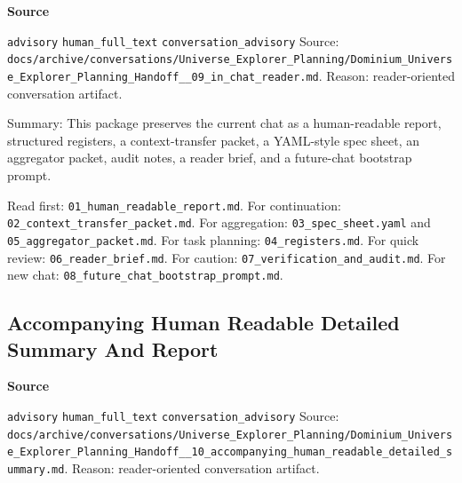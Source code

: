 \documentclass[9pt,a4paper,openany]{book}
\newcommand{\vonecallout}[3]{\par\medskip\noindent\begingroup\setlength{\fboxsep}{7pt}\colorbox{DomCalloutBg}{\parbox{0.94\linewidth}{\textbf{\textcolor{#1}{#2}}\par #3}}\endgroup\par\medskip}
\begin{document}
\vonecallout{DomSlate}{Source}{\texttt{advisory} \texttt{human\_\allowbreak{}full\_\allowbreak{}text} \texttt{conversation\_\allowbreak{}advisory} Source: \texttt{docs/\allowbreak{}archive/\allowbreak{}conversations/\allowbreak{}Universe\_\allowbreak{}Explorer\_\allowbreak{}Planning/\allowbreak{}Dominium\_\allowbreak{}Universe\_\allowbreak{}Explorer\_\allowbreak{}Planning\_\allowbreak{}Handoff\_\allowbreak{}\_\allowbreak{}09\_\allowbreak{}in\_\allowbreak{}chat\_\allowbreak{}reader.\allowbreak{}md}.\allowbreak{} Reason: reader-\allowbreak{}oriented conversation artifact.\allowbreak{}}

Summary: This package preserves the current chat as a human-\allowbreak{}readable report, structured registers, a context-\allowbreak{}transfer packet, a YAML-\allowbreak{}style spec sheet, an aggregator packet, audit notes, a reader brief, and a future-\allowbreak{}chat bootstrap prompt.\allowbreak{}


Read first: \texttt{01\_\allowbreak{}human\_\allowbreak{}readable\_\allowbreak{}report.\allowbreak{}md}.\allowbreak{} For continuation: \texttt{02\_\allowbreak{}context\_\allowbreak{}transfer\_\allowbreak{}packet.\allowbreak{}md}.\allowbreak{} For aggregation: \texttt{03\_\allowbreak{}spec\_\allowbreak{}sheet.\allowbreak{}yaml} and \texttt{05\_\allowbreak{}aggregator\_\allowbreak{}packet.\allowbreak{}md}.\allowbreak{} For task planning: \texttt{04\_\allowbreak{}registers.\allowbreak{}md}.\allowbreak{} For quick review: \texttt{06\_\allowbreak{}reader\_\allowbreak{}brief.\allowbreak{}md}.\allowbreak{} For caution: \texttt{07\_\allowbreak{}verification\_\allowbreak{}and\_\allowbreak{}audit.\allowbreak{}md}.\allowbreak{} For new chat: \texttt{08\_\allowbreak{}future\_\allowbreak{}chat\_\allowbreak{}bootstrap\_\allowbreak{}prompt.\allowbreak{}md}.\allowbreak{}



\subsection{Accompanying Human Readable Detailed Summary And Report}

\vonecallout{DomSlate}{Source}{\texttt{advisory} \texttt{human\_\allowbreak{}full\_\allowbreak{}text} \texttt{conversation\_\allowbreak{}advisory} Source: \texttt{docs/\allowbreak{}archive/\allowbreak{}conversations/\allowbreak{}Universe\_\allowbreak{}Explorer\_\allowbreak{}Planning/\allowbreak{}Dominium\_\allowbreak{}Universe\_\allowbreak{}Explorer\_\allowbreak{}Planning\_\allowbreak{}Handoff\_\allowbreak{}\_\allowbreak{}10\_\allowbreak{}accompanying\_\allowbreak{}human\_\allowbreak{}readable\_\allowbreak{}detailed\_\allowbreak{}summary.\allowbreak{}md}.\allowbreak{} Reason: reader-\allowbreak{}oriented conversation artifact.\allowbreak{}}
\end{document}
